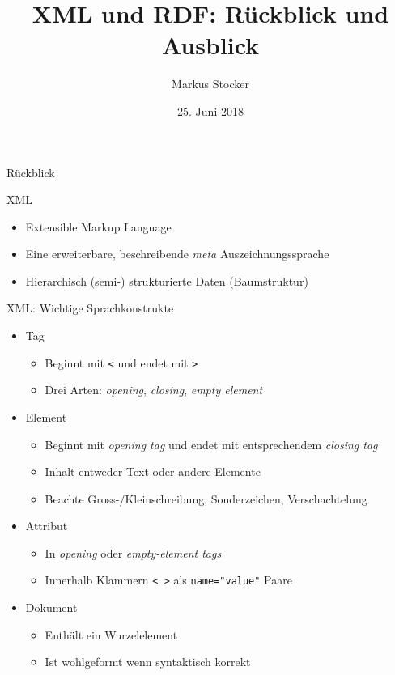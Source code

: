 \documentclass{beamer}
\title{XML und RDF: Rückblick und Ausblick}
\author{Markus Stocker}
\date{25. Juni 2018}
\begin{document}
\maketitle

\begin{frame}[plain]{}
	
	\huge
	\begin{center}
		Rückblick
	\end{center}
	
\end{frame}

\begin{frame}{XML}
	
	\begin{itemize}
		\item Extensible Markup Language
		\item Eine erweiterbare, beschreibende \emph{meta} Auszeichnungssprache
		\item Hierarchisch (semi-) strukturierte Daten (Baumstruktur)
	\end{itemize}
	
\end{frame}

\begin{frame}{XML: Wichtige Sprachkonstrukte}
	
	\begin{itemize}
		\item Tag
		\begin{itemize}
			\item Beginnt mit \texttt{<} und endet mit \texttt{>}
			\item Drei Arten: \emph{opening}, \emph{closing}, \emph{empty element}
		\end{itemize}
		\item Element
		\begin{itemize}
			\item Beginnt mit \emph{opening tag} und endet mit entsprechendem \emph{closing tag}
			\item Inhalt entweder Text oder andere Elemente
			\item Beachte Gross-/Kleinschreibung, Sonderzeichen, Verschachtelung
		\end{itemize}
		\item Attribut
		\begin{itemize}
			\item In \emph{opening} oder \emph{empty-element tags}
			\item Innerhalb Klammern \texttt{< >} als \texttt{name="value"} Paare
		\end{itemize}
		\item Dokument
		\begin{itemize}
			\item Enthält ein Wurzelelement
			\item Ist wohlgeformt wenn syntaktisch korrekt
		\end{itemize}
	\end{itemize}
	
\end{frame}
\end{document}
